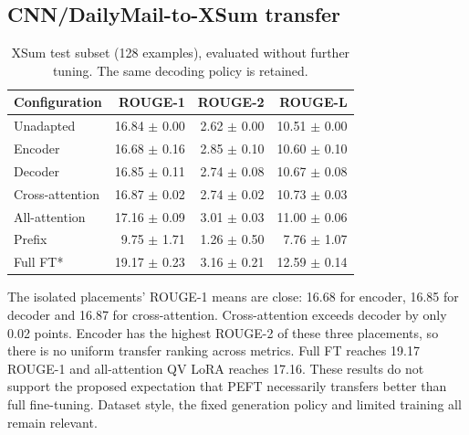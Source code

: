 \documentclass[11pt,letterpaper]{article}
\begin{document}
\subsection{CNN/DailyMail-to-XSum transfer}
\begin{table}[H]
\centering
\small
\begin{tabular}{lrrr}\toprule Configuration & ROUGE-1 & ROUGE-2 & ROUGE-L\\\midrule
Unadapted & 16.84 $\pm$ 0.00 & 2.62 $\pm$ 0.00 & 10.51 $\pm$ 0.00\\
Encoder & 16.68 $\pm$ 0.16 & 2.85 $\pm$ 0.10 & 10.60 $\pm$ 0.10\\
Decoder & 16.85 $\pm$ 0.11 & 2.74 $\pm$ 0.08 & 10.67 $\pm$ 0.08\\
Cross-attention & 16.87 $\pm$ 0.02 & 2.74 $\pm$ 0.02 & 10.73 $\pm$ 0.03\\
All-attention & 17.16 $\pm$ 0.09 & 3.01 $\pm$ 0.03 & 11.00 $\pm$ 0.06\\
Prefix & 9.75 $\pm$ 1.71 & 1.26 $\pm$ 0.50 & 7.76 $\pm$ 1.07\\
Full FT* & 19.17 $\pm$ 0.23 & 3.16 $\pm$ 0.21 & 12.59 $\pm$ 0.14\\
\bottomrule\end{tabular}
\caption{XSum test subset (128 examples), evaluated without further tuning. The same decoding policy is retained.}
\end{table}

The isolated placements' ROUGE-1 means are close: 16.68 for encoder, 16.85 for decoder and 16.87 for cross-attention. Cross-attention exceeds decoder by only 0.02 points. Encoder has the highest ROUGE-2 of these three placements, so there is no uniform transfer ranking across metrics. Full FT reaches 19.17 ROUGE-1 and all-attention QV LoRA reaches 17.16. These results do not support the proposed expectation that PEFT necessarily transfers better than full fine-tuning. Dataset style, the fixed generation policy and limited training all remain relevant.
\end{document}
